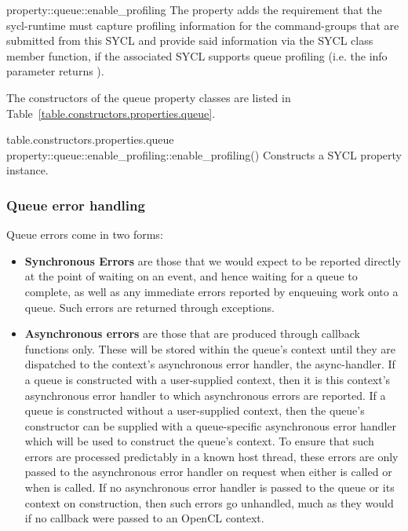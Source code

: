 \addRow
  { property::queue::enable_profiling }
  {
    The  property adds the requirement
    that the \gls{sycl-runtime} must capture profiling information for
    the \glspl{command-group} that are submitted from this SYCL
     and provide said information via the SYCL
     class  member
    function, if the associated SYCL  supports
    queue profiling (i.e. the  info parameter returns ).
  }
\completeTable

The constructors of the queue property classes are listed in Table~\ref{table.constructors.properties.queue}.

{table.constructors.properties.queue}
\addRow
{property::queue::enable_profiling::enable_profiling()}
{
  Constructs a SYCL  property instance.
}
\completeTable

\subsubsection{Queue error handling}
\label{sec:interface.queue.errors}

Queue errors come in two forms:
\begin{itemize}

  \item
    \textbf{Synchronous Errors} are those that we would expect to be
    reported directly at the point of waiting on an event, and hence
    waiting for a queue to complete, as well as any immediate errors
    reported by enqueuing work onto a queue. Such errors are returned
    through exceptions.

  \item
    \textbf{Asynchronous errors} are those that are produced through
    callback functions only. These will be stored within the queue's
    context until they are dispatched to the context's asynchronous
    error handler, the \gls{async-handler}. If a queue is constructed 
    with a user-supplied context, then it is this context's asynchronous error
    handler to which asynchronous errors are reported. If a queue is constructed
    without a user-supplied context, then the queue's constructor
    can be supplied with a queue-specific asynchronous error handler
    which will be used to construct the queue's context.
    To ensure that such errors are
    processed predictably in a known host thread, these errors are only
    passed to the asynchronous error handler on request when either
     is called or when
     is called. If no
    asynchronous error handler is passed to the queue or its context
    on construction, then such errors go unhandled, much as they would
    if no callback were passed to an OpenCL context.

\end{itemize}

